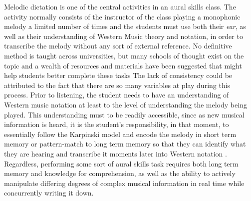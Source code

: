 \documentclass[12pt,]{book}
\begin{document}
Melodic dictation is one of the central activities in an aural skills class.
The activity normally consists of the instructor of the class playing a monophonic melody a limited number of times and the students must use both their \emph{ear}, as well as their understanding of Western Music theory and notation, in order to transcribe the melody without any sort of external reference.
No definitive method is taught across universities, but many schools of thought exist on the topic and a wealth of resources and materials have been suggested that might help students better complete these tasks \citep{berkowitzNewApproachSight2011, clelandDevelopingMusicianshipAural2010, karpinskiManualEarTraining2007, ottmanMusicSightSinging2014}
The lack of consistency could be attributed to the fact that there are so many variables at play during this process.
Prior to listening, the student needs to have an understanding of Western music notation at least to the level of understanding the melody being played.
This understanding must to be readily accessible, since as new musical information is heard, it is the student's responsibility, in that moment, to essentially follow the Karpinski model and encode the melody in short term memory or pattern-match to long term memory \citep{ouraConstructingRepresentationMelody1991a} so that they can identify what they are hearing and transcribe it moments later into Western notation \citep{karpinskiAuralSkillsAcquisition2000, karpinskiModelMusicPerception1990}.
Regardless, performing some sort of aural skills task requires both long term memory and knowledge for comprehension, as well as the ability to actively manipulate differing degrees of complex musical information in real time while concurrently writing it down.
\end{document}
